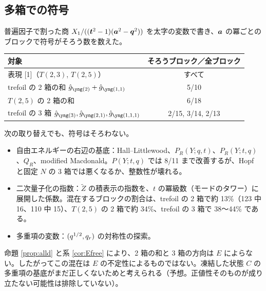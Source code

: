 \subsection{多箱での符号}
\begin{compresult}\label{cr:signs}
普遍因子で割った商 $X_1/((\bm{t}^2-1)(\bm{a}^2-\bm{q}^2))$ を太字の変数で書き、$\bm{a}$ の冪ごとのブロックで符号がそろう数を数えた。
\begin{center}
\begin{tabular}{lc}
\toprule
対象 & そろうブロック／全ブロック \\
\midrule
表現 [1]（$T(2,3)$, $T(2,5)$） & すべて \\
trefoil の 2 箱の和 $\hat g_{\ytwo} + \hat g_{\yoneone}$ & 5/10 \\
$T(2,5)$ の 2 箱の和 & 6/18 \\
trefoil の 3 箱 $\hat g_{\ythree}, \hat g_{\ytwoone}, \hat g_{\yoneoneone}$ & 2/15, 3/14, 2/13 \\
\bottomrule
\end{tabular}
\end{center}
次の取り替えでも、符号はそろわない。
\begin{itemize}
\item 自由エネルギーの右辺の基底：Hall--Littlewood、$P_R(Y; q, t)$、$P_R(Y; t, q)$、$Q_R$、modified Macdonald。$P(Y;t,q)$ では 8/11 まで改善するが、Hopf と固定 $N$ の 3 箱では悪くなるか、整数性が壊れる。
\item 二次量子化の指数：$\tilde Z$ の積表示の指数を、$t$ の冪級数（モードのタワー）に展開した係数。混在するブロックの割合は、trefoil の 2 箱で約 13\%（123 中 16、110 中 15）、$T(2,5)$ の 2 箱で約 34\%、trefoil の 3 箱で 38〜44\% である。
\item 多重項の変数：$(q^{1/2}, q_r)$ の対称性の探索。
\end{itemize}
\end{compresult}
命題 \ref{prop:alld} と系 \ref{cor:Efree} により、2 箱の和と 3 箱の方向は $E$ によらない。したがってこの混在は $E$ の不定性によるものではない。凍結した状態 $C$ の多重項の基底がまだ正しくないためと考えられる（予想。正値性そのものが成り立たない可能性は排除していない）。

